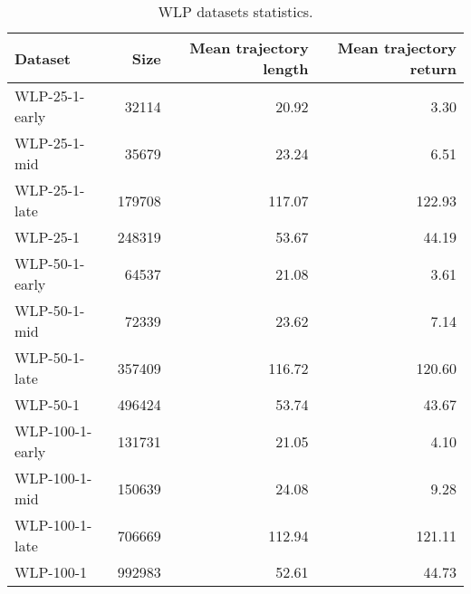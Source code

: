 \begin{table}[ht]
    \label{tab:wlp_stats}
    \begin{center}
        \caption{WLP datasets statistics.}

    \begin{small}
    \begin{adjustbox}{max width=\columnwidth}
		\begin{tabular}{l|rrr}
		\toprule
	\textbf{Dataset} & \textbf{Size} & \textbf{Mean trajectory length} & \textbf{Mean trajectory return}\\
\midrule
WLP-25-1-early & 32114 & 20.92 & 3.30\\
WLP-25-1-mid & 35679 & 23.24 & 6.51\\
WLP-25-1-late & 179708 & 117.07 & 122.93\\
WLP-25-1 & 248319 & 53.67 & 44.19\\
\midrule
WLP-50-1-early & 64537 & 21.08 & 3.61\\
WLP-50-1-mid & 72339 & 23.62 & 7.14\\
WLP-50-1-late & 357409 & 116.72 & 120.60\\
WLP-50-1 & 496424 & 53.74 & 43.67\\
\midrule
WLP-100-1-early & 131731 & 21.05 & 4.10\\
WLP-100-1-mid & 150639 & 24.08 & 9.28\\
WLP-100-1-late & 706669 & 112.94 & 121.11\\
WLP-100-1 & 992983 & 52.61 & 44.73\\
\bottomrule
\end{tabular}
        \end{adjustbox}
    \end{small}
    \end{center}
    \vskip -0.1in
\end{table}
    